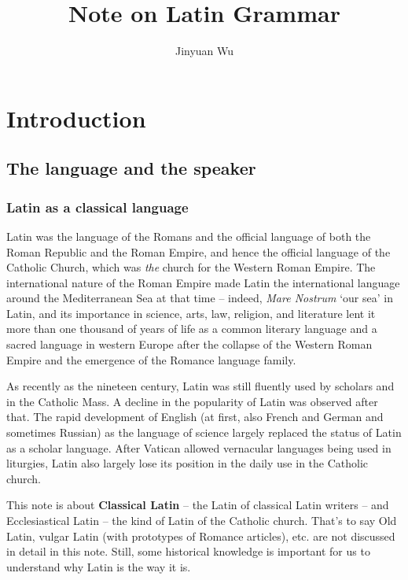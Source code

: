 \documentclass[a4paper, oneside]{report}
\title{Note on Latin Grammar}
\author{Jinyuan Wu}
\newcommand*{\concept}[1]{\textbf{#1}}
\newcommand{\corpus}[1]{\emph{#1}}
\newcommand{\translate}[1]{`#1'}
\begin{document}
\automath

\maketitle

\chapter{Introduction}

\section{The language and the speaker}

\subsection{Latin as a classical language}

Latin was the language of the Romans
and the official language of both the Roman Republic and the Roman Empire,
and hence the official language of the Catholic Church, 
which was \emph{the} church for the Western Roman Empire. 
The international nature of the Roman Empire made Latin 
the international language around the Mediterranean Sea at that time -- 
indeed, \corpus{Mare Nostrum} \translate{our sea} in Latin,
and its importance in science, arts, law, religion, and literature 
lent it more than one thousand of years of life 
as a common literary language and a sacred language in western Europe
after the collapse of the Western Roman Empire 
and the emergence of the Romance language family.

As recently as the nineteen century,
Latin was still fluently used by scholars and in the Catholic Mass. 
A decline in the popularity of Latin was observed after that.
The rapid development of English (at first, also French and German and sometimes Russian)
as the language of science 
largely replaced the status of Latin as a scholar language.
After Vatican allowed vernacular languages being used in liturgies, 
Latin also largely lose its position in the daily use in the Catholic church. 

This note is about \concept{Classical Latin} -- the Latin of classical Latin writers -- 
and Ecclesiastical Latin -- the kind of Latin of the Catholic church.
That's to say Old Latin, vulgar Latin (with prototypes of Romance articles), etc.
are not discussed in detail in this note.
Still, some historical knowledge is important for us to understand 
why Latin is the way it is. 
\end{document}

